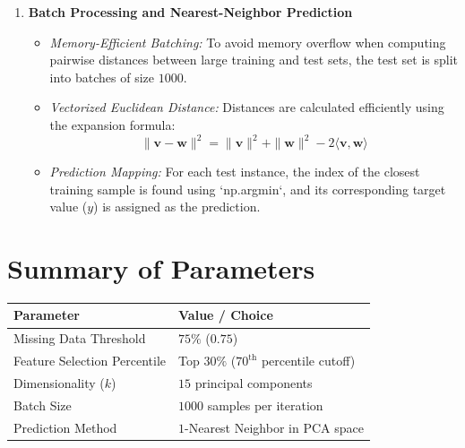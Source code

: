 \documentclass[11pt, a4paper]{article}
\begin{document}
\begin{enumerate}[leftmargin=*]
    \item \textbf{Batch Processing and Nearest-Neighbor Prediction}
    \begin{itemize}
        \item \emph{Memory-Efficient Batching:} To avoid memory overflow when computing pairwise distances between large training and test sets, the test set is split into batches of size $1000$.
        \item \emph{Vectorized Euclidean Distance:} Distances are calculated efficiently using the expansion formula:
        $$\|\mathbf{v} - \mathbf{w}\|^2 = \|\mathbf{v}\|^2 + \|\mathbf{w}\|^2 - 2\langle\mathbf{v}, \mathbf{w}\rangle$$
        \item \emph{Prediction Mapping:} For each test instance, the index of the closest training sample is found using `np.argmin`, and its corresponding target value ($y$) is assigned as the prediction.
    \end{itemize}
\end{enumerate}

\section{Summary of Parameters}
\begin{table}[h]
\centering
\begin{tabular}{ll}
\toprule
\textbf{Parameter} & \textbf{Value / Choice} \\
\midrule
Missing Data Threshold & $75\%$ ($0.75$) \\
Feature Selection Percentile & Top $30\%$ ($70^{\text{th}}$ percentile cutoff) \\
Dimensionality ($k$) & $15$ principal components \\
Batch Size & $1000$ samples per iteration \\
Prediction Method & $1$-Nearest Neighbor in PCA space \\
\bottomrule
\end{tabular}
\label{tab:params}
\end{table}
\end{document}
